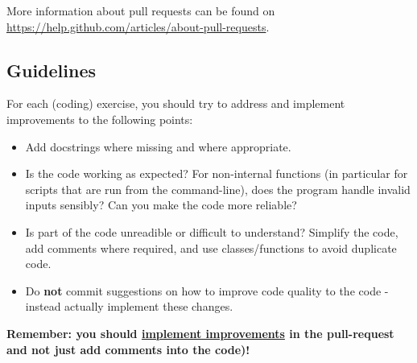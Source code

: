 \documentclass[a4paper]{article}
\begin{document}
More information about pull requests can be found on \url{https://help.github.com/articles/about-pull-requests}.


\subsection{Guidelines}\label{sec:general_review}
For each (coding) exercise, you should try to address and implement improvements to the following points:

\begin{itemize}
  \item Add docstrings where missing and where appropriate.
  \item Is the code working as expected? For non-internal functions (in particular for scripts that are run from the command-line), does the program handle invalid inputs sensibly? Can you make the code more reliable?
  \item Is part of the code unreadible or difficult to understand? Simplify the code, add comments where required, and use classes/functions to avoid duplicate code. 
\item Do \textbf{not} commit suggestions on how to improve code quality to the code - instead actually implement these changes. 
\end{itemize}

\textbf{Remember: you should \underline{implement improvements} in the pull-request and not just add comments into the code)!}


\end{document}

